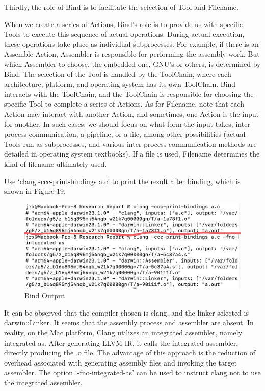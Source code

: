 \documentclass[conference]{IEEEtran}
\begin{document}
Thirdly, the role of Bind is to facilitate the selection of Tool and Filename.

When we create a series of Actions, Bind's role is to provide us with specific Tools to execute this sequence of actual operations. During actual execution, these operations take place as individual subprocesses. For example, if there is an Assemble Action, Assembler is responsible for performing the assembly work. But which Assembler to choose, the embedded one, GNU's or others, is determined by Bind. The selection of the Tool is handled by the ToolChain, where each architecture, platform, and operating system has its own ToolChain. Bind interacts with the ToolChain, and the ToolChain is responsible for choosing the specific Tool to complete a series of Actions. As for Filename, note that each Action may interact with another Action, and sometimes, one Action is the input for another. In such cases, we should focus on what form the input takes, inter-process communication, a pipeline, or a file, among other possibilities (actual Tools run as subprocesses, and various inter-process communication methods are detailed in operating system textbooks). If a file is used, Filename determines the kind of filename ultimately used.

Use `clang -ccc-print-bindings a.c' to print the result after binding, which is shown in Figure 19.

\begin{figure}[htbp]
\centering
\includegraphics [width=0.9\linewidth]{pictures/Binding.png}
\caption{Bind Output}
\label{fig19}
\end{figure}

It can be observed that the compiler chosen is clang, and the linker selected is darwin::Linker. It seems that the assembly process and assembler are absent. In reality, on the Mac platform, Clang utilizes an integrated assembler, namely integrated-as. After generating LLVM IR, it calls the integrated assembler, directly producing the .o file. The advantage of this approach is the reduction of overhead associated with generating assembly files and invoking the target assembler. The option `-fno-integrated-as' can be used to instruct clang not to use the integrated assembler.
\end{document}

